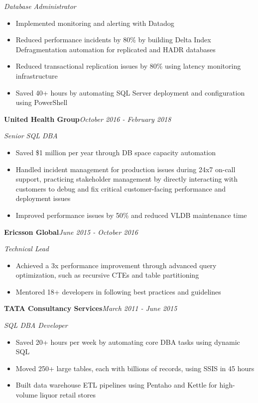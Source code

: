 \documentclass[10pt,a4paper]{article}
\begin{document}
\textit{Database Administrator}\\[-5pt]
\begin{itemize}
  \item Implemented monitoring and alerting with Datadog
  \item Reduced performance incidents by 80\% by building Delta Index Defragmentation automation for replicated and HADR databases
  \item Reduced transactional replication issues by 80\% using latency monitoring infrastructure
  \item Saved 40+ hours by automating SQL Server deployment and configuration using PowerShell
\end{itemize}
\vspace{14.7pt}
\noindent\textbf{United Health Group}\hfill \textit{October 2016 - February 2018}

\textit{Senior SQL DBA}\\[-5pt]
\begin{itemize}
  \item Saved \$1 million per year through DB space capacity automation
  \item Handled incident management for production issues during 24x7 on-call support, practicing stakeholder management by directly interacting with customers to debug and fix critical customer-facing performance and deployment issues
  \item Improved performance issues by 50\% and reduced VLDB maintenance time
\end{itemize}
\vspace{14.7pt}
\noindent\textbf{Ericsson Global}\hfill \textit{June 2015 - October 2016}

\textit{Technical Lead}\\[-5pt]
\begin{itemize}
  \item Achieved a 3x performance improvement through advanced query optimization, such as recursive CTEs and table partitioning
  \item Mentored 18+ developers in following best practices and guidelines
\end{itemize}
\vspace{14.7pt}
\noindent\textbf{TATA Consultancy Services}\hfill \textit{March 2011 - June 2015}

\textit{SQL DBA Developer}\\[-5pt]
\begin{itemize}
  \item Saved 20+ hours per week by automating core DBA tasks using dynamic SQL
  \item Moved 250+ large tables, each with billions of records, using SSIS in 45 hours
  \item Built data warehouse ETL pipelines using Pentaho and Kettle for high-volume liquor retail stores
\end{itemize}
\end{document}
